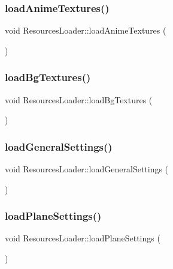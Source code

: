 \subsubsection{\texorpdfstring{load\+Anime\+Textures()}{loadAnimeTextures()}}
{\footnotesize\ttfamily void Resources\+Loader\+::load\+Anime\+Textures (\begin{DoxyParamCaption}{ }\end{DoxyParamCaption})}

\mbox{\label{class_resources_loader_a5099528fcfd109b389965e5ebfbdb661}} 
\subsubsection{\texorpdfstring{load\+Bg\+Textures()}{loadBgTextures()}}
{\footnotesize\ttfamily void Resources\+Loader\+::load\+Bg\+Textures (\begin{DoxyParamCaption}{ }\end{DoxyParamCaption})}

\mbox{\label{class_resources_loader_aae8a0b49efa4191ba01cc832c32dbd95}} 
\subsubsection{\texorpdfstring{load\+General\+Settings()}{loadGeneralSettings()}}
{\footnotesize\ttfamily void Resources\+Loader\+::load\+General\+Settings (\begin{DoxyParamCaption}{ }\end{DoxyParamCaption})}

\mbox{\label{class_resources_loader_a56b70b8ad03c9fde2736d425adfd97e7}} 
\subsubsection{\texorpdfstring{load\+Plane\+Settings()}{loadPlaneSettings()}}
{\footnotesize\ttfamily void Resources\+Loader\+::load\+Plane\+Settings (\begin{DoxyParamCaption}{ }\end{DoxyParamCaption})}

